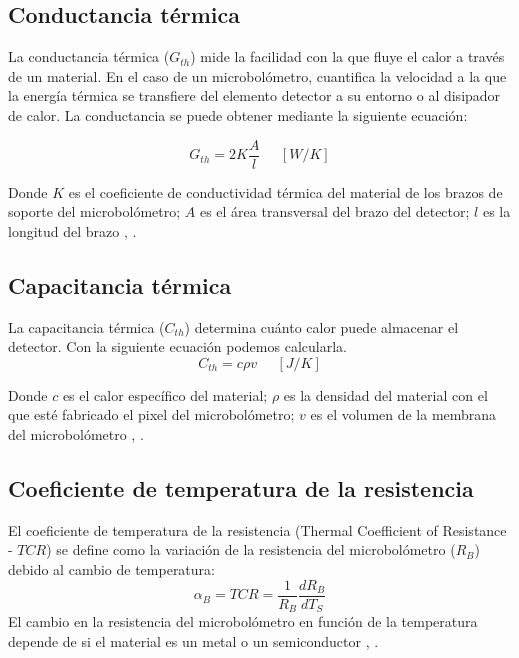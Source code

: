        \subsection{Conductancia térmica}
        La conductancia térmica ($G_{th}$) mide la facilidad con la que fluye el calor a través de un material. En el caso de un microbolómetro, cuantifica la velocidad a la que la energía térmica se transfiere del elemento detector a su entorno o al disipador de calor. La conductancia se puede obtener mediante la siguiente ecuación:
        
        \begin{equation}
        G_{th} = 2K\frac{A}{l}\phantom{abc} [W/K]
        \label{eq:Conductancia}
        \end{equation}
           
        Donde $K$ es el coeficiente de conductividad térmica del material de los brazos de soporte del microbolómetro; $A$ es el área transversal del brazo del detector; $l$ es la longitud del brazo \cite{BlancoMDA}, \cite{Jimenez} \cite{Bhan2009}.
        
        \subsection{Capacitancia térmica}
        La capacitancia térmica ($C_{th}$) determina cuánto calor puede almacenar el detector. Con la siguiente ecuación podemos calcularla.
        \begin{equation}
        C_{th} = c\rho v\phantom{abc} [J/K]
        \label{eq:Capacitancia}
        \end{equation}
         
        Donde $c$ es el calor específico del material; $\rho$ es la densidad del material con el que esté fabricado el pixel del microbolómetro; $v$ es el volumen de la membrana del microbolómetro \cite{BlancoMDA}, \cite{Jimenez} \cite{Bhan2009}.
        
        \subsection{Coeficiente de temperatura de la resistencia}
        El coeficiente de temperatura de la resistencia (Thermal Coefficient of Resistance - $TCR$) se define como la variación de la resistencia del microbolómetro ($R_{B}$) debido al cambio de temperatura:
        \begin{equation}
        \alpha_{B} = TCR =\frac{1}{R_{B}}\frac{dR_{B}}{dT_{S}}
        \label{eq:TCR}
        \end{equation}
        El cambio en la resistencia del microbolómetro en función de la temperatura depende de si el material es un metal o un semiconductor \cite{Budzier}, \cite{Wei2015}.  
               
